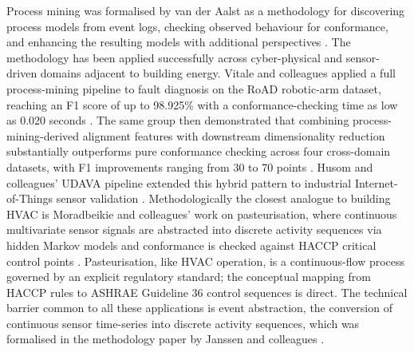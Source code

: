 \documentclass[11pt,letterpaper]{article}
\begin{document}
Process mining was formalised by van der Aalst as a methodology for discovering process models from event logs, checking observed behaviour for conformance, and enhancing the resulting models with additional perspectives \cite{vanderaalst2016processmining}. The methodology has been applied successfully across cyber-physical and sensor-driven domains adjacent to building energy. Vitale and colleagues applied a full process-mining pipeline to fault diagnosis on the RoAD robotic-arm dataset, reaching an F1 score of up to 98.925\% with a conformance-checking time as low as 0.020 seconds \cite{vitale2025roadcps}. The same group then demonstrated that combining process-mining-derived alignment features with downstream dimensionality reduction substantially outperforms pure conformance checking across four cross-domain datasets, with F1 improvements ranging from 30 to 70 points \cite{vitale2025kbsfeatures}. Husom and colleagues' UDAVA pipeline extended this hybrid pattern to industrial Internet-of-Things sensor validation \cite{husom2026udava}. Methodologically the closest analogue to building HVAC is Moradbeikie and colleagues' work on pasteurisation, where continuous multivariate sensor signals are abstracted into discrete activity sequences via hidden Markov models and conformance is checked against HACCP critical control points \cite{moradbeikie2025pasteurization}. Pasteurisation, like HVAC operation, is a continuous-flow process governed by an explicit regulatory standard; the conceptual mapping from HACCP rules to ASHRAE Guideline 36 control sequences is direct. The technical barrier common to all these applications is event abstraction, the conversion of continuous sensor time-series into discrete activity sequences, which was formalised in the methodology paper by Janssen and colleagues \cite{janssen2021sensoreventlog}.
\end{document}
